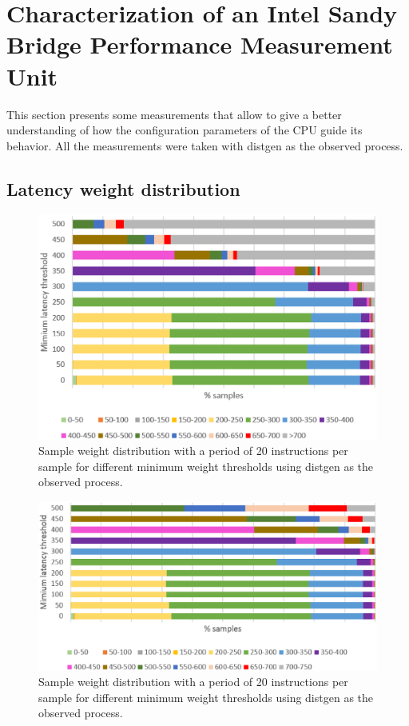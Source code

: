 \section{Characterization of an Intel Sandy Bridge Performance Measurement Unit}\label{section:pmu-charzn}
This section presents some measurements that allow to give a better understanding of how the configuration parameters of the CPU guide its behavior. All the measurements were taken with distgen as the observed process.


\subsection{Latency weight distribution}\label{subsection:pmu-latwei}

\begin{figure}[th]
	\centering
		\includegraphics[width=.8\textwidth]{figures/latencydistw20.eps}
		\caption[Sample weight distribution with a period of 20 instructions per sample.]{Sample weight distribution with a period of 20 instructions per sample for different minimum weight thresholds using distgen as the observed process. }
		\label{fig:latencydistw20}
\end{figure}

\begin{figure}[h]
	\centering
		\includegraphics[width=.8\textwidth]{figures/latencydistw200.eps}
		\caption[Sample weight distribution with a period of 200 instructions per sample.]{Sample weight distribution with a period of 20 instructions per sample for different minimum weight thresholds using distgen as the observed process.}
		\label{fig:latencydistw200}
\end{figure}


